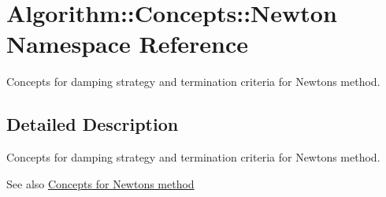 \hypertarget{namespaceAlgorithm_1_1Concepts_1_1Newton}{}\section{Algorithm\+:\+:Concepts\+:\+:Newton Namespace Reference}
\label{namespaceAlgorithm_1_1Concepts_1_1Newton}


Concepts for damping strategy and termination criteria for Newton\textquotesingle{}s method.  




\subsection{Detailed Description}
Concepts for damping strategy and termination criteria for Newton\textquotesingle{}s method. 

\begin{DoxySeeAlso}{See also}
\hyperlink{group__NewtonConceptGroup}{Concepts for Newton\textquotesingle{}s method} 
\end{DoxySeeAlso}
